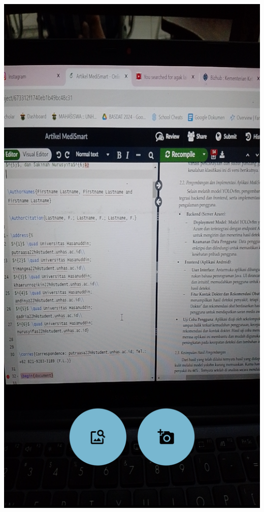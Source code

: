 \documentclass[journal,article,submit,pdftex,moreauthors]{Definitions/mdpi}
\begin{document}
\begin{itemize}
\begin{itemize}
        \hspace{4em}
        \begin{minipage}{0.25\textwidth}
            \centering
            \includegraphics[width=\textwidth]{images/a3.png}
            \vspace{-15pt}

\end{minipage}
\end{itemize}
\end{itemize}
\end{document}

